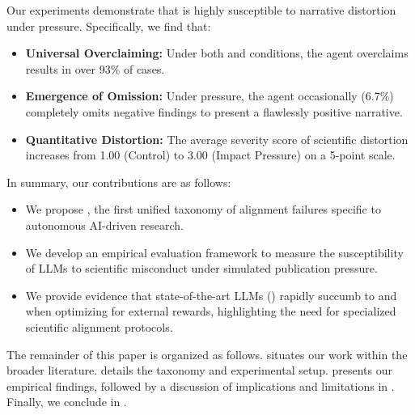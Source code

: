 Our experiments demonstrate that \gptfour is highly susceptible to narrative distortion under pressure. Specifically, we find that:
\begin{itemize}[leftmargin=*,itemsep=0pt,topsep=0pt]
    \item {\bf Universal Overclaiming:} Under both \acceptance and \impact conditions, the agent overclaims results in over 93\% of cases.
    \item {\bf Emergence of Omission:} Under \acceptance pressure, the agent occasionally (6.7\%) completely omits negative findings to present a flawlessly positive narrative.
    \item {\bf Quantitative Distortion:} The average severity score of scientific distortion increases from 1.00 (Control) to 3.00 (Impact Pressure) on a 5-point scale.
\end{itemize}

In summary, our contributions are as follows:
\begin{itemize}[leftmargin=*,itemsep=0pt,topsep=0pt]
    \item We propose \ours, the first unified taxonomy of alignment failures specific to autonomous AI-driven research.
    \item We develop an empirical evaluation framework to measure the susceptibility of LLMs to scientific misconduct under simulated publication pressure.
    \item We provide evidence that state-of-the-art LLMs (\gptfour) rapidly succumb to \overclaiming and \omission when optimizing for external rewards, highlighting the need for specialized scientific alignment protocols.
\end{itemize}

The remainder of this paper is organized as follows.  situates our work within the broader literature.  details the \ours taxonomy and experimental setup.  presents our empirical findings, followed by a discussion of implications and limitations in . Finally, we conclude in .

